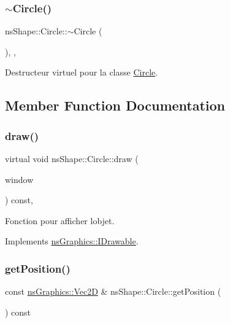 \subsubsection{\texorpdfstring{$\sim$\+Circle()}{~Circle()}}
{\footnotesize\ttfamily ns\+Shape\+::\+Circle\+::$\sim$\+Circle (\begin{DoxyParamCaption}{ }\end{DoxyParamCaption})\hspace{0.3cm}{\ttfamily [override]}, {\ttfamily [virtual]}, {\ttfamily [default]}}



Destructeur virtuel pour la classe \hyperlink{classns_shape_1_1_circle}{Circle}. 



\subsection{Member Function Documentation}
\mbox{\label{classns_shape_1_1_circle_a279581f6104719395091039cea1707e5}} 
\subsubsection{\texorpdfstring{draw()}{draw()}}
{\footnotesize\ttfamily virtual void ns\+Shape\+::\+Circle\+::draw (\begin{DoxyParamCaption}\item[{\hyperlink{class_min_g_l}{Min\+GL} \&}]{window }\end{DoxyParamCaption}) const\hspace{0.3cm}{\ttfamily [override]}, {\ttfamily [virtual]}}



Fonction pour afficher l\textquotesingle{}objet. 



Implements \hyperlink{classns_graphics_1_1_i_drawable_abed8a61e1d507d31e76f0891f3bf9c51}{ns\+Graphics\+::\+I\+Drawable}.

\mbox{\label{classns_shape_1_1_circle_a85b4102c4a23101fba4f90c1f8e84168}} 
\subsubsection{\texorpdfstring{get\+Position()}{getPosition()}}
{\footnotesize\ttfamily const \hyperlink{classns_graphics_1_1_vec2_d}{ns\+Graphics\+::\+Vec2D} \& ns\+Shape\+::\+Circle\+::get\+Position (\begin{DoxyParamCaption}{ }\end{DoxyParamCaption}) const}



